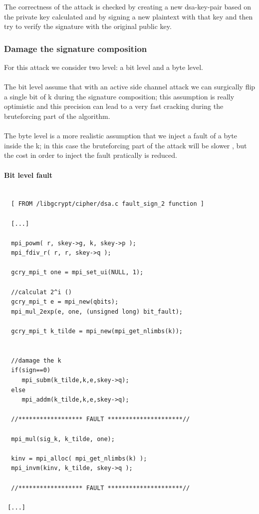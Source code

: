 \documentclass[11pt,english]{article}
\begin{document}
The correctness of the attack is checked by creating a new dsa-key-pair based on the private key calculated and by signing a new plaintext with that key and then try to verify the signature with the original public key.


\subsubsection{Damage the signature composition}

For this attack we consider two level: a bit level and a byte level.\\\\ The bit level assume that with an active side channel attack we can surgically flip a single bit of k during the signature composition; this assumption is really optimistic and this precision can lead to a very fast cracking during the bruteforcing part of the algorithm.\\\\ The byte level is a more realistic assumption that we inject a fault of a byte inside the k; in this case the bruteforcing part of the attack will be slower , but the cost in order to inject the fault pratically is reduced.

\paragraph{Bit level fault}

\begin{lstlisting}
 
  [ FROM /libgcrypt/cipher/dsa.c fault_sign_2 function ]

  [...]
  
  mpi_powm( r, skey->g, k, skey->p );
  mpi_fdiv_r( r, r, skey->q );

  gcry_mpi_t one = mpi_set_ui(NULL, 1); 

  //calculat 2^i ()
  gcry_mpi_t e = mpi_new(qbits);
  mpi_mul_2exp(e, one, (unsigned long) bit_fault);  

  gcry_mpi_t k_tilde = mpi_new(mpi_get_nlimbs(k));
  

  //damage the k
  if(sign==0)
     mpi_subm(k_tilde,k,e,skey->q);  
  else
     mpi_addm(k_tilde,k,e,skey->q);

  //****************** FAULT *********************//
  
  mpi_mul(sig_k, k_tilde, one);
  
  kinv = mpi_alloc( mpi_get_nlimbs(k) );
  mpi_invm(kinv, k_tilde, skey->q );
  
  //****************** FAULT *********************//
  
 [...]

\end{lstlisting}
\end{document}
